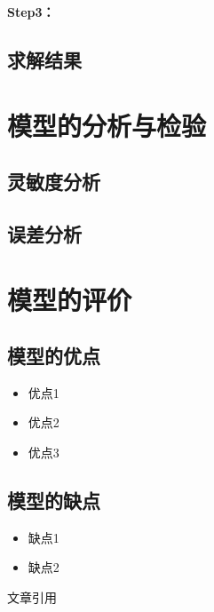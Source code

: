 \documentclass[withoutpreface]{njtechmcmthesis}
\begin{document}
\textbf{Step3：} 

\subsection{求解结果}


\section{模型的分析与检验}

\subsection{灵敏度分析}

\subsection{误差分析}


\section{模型的评价}

\subsection{模型的优点}
\begin{itemize}[itemindent=2em]
\item 优点1
\item 优点2
\item 优点3
\end{itemize}

\subsection{模型的缺点}
\begin{itemize}[itemindent=2em]
\item 缺点1
\item 缺点2
\end{itemize}
文章引用\cite{陈秀梅2001对类风湿关节炎病人性格的调查分析}
\nocite{*}
\end{document}
